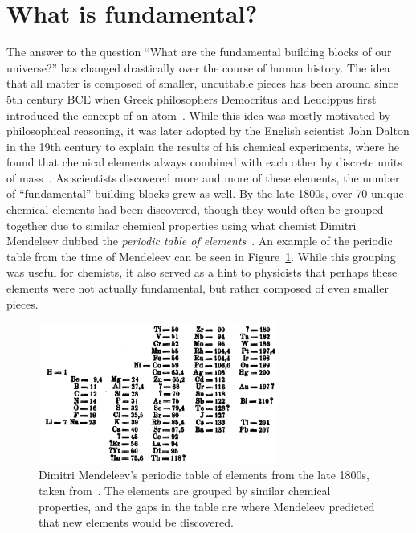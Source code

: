 \section{What is fundamental?}
The answer to the question ``What are the fundamental building blocks of our universe?'' has changed drastically over the course of human history. The idea that all matter is composed of smaller, uncuttable pieces has been around since 5th century BCE when Greek philosophers Democritus and Leucippus first introduced the concept of an atom~\cite{GreekAtom}. While this idea was mostly motivated by philosophical reasoning, it was later adopted by the English scientist John Dalton in the 19th century to explain the results of his chemical experiments, where he found that chemical elements always combined with each other by discrete units of mass~\cite{Dalton}. As scientists discovered more and more of these elements, the number of ``fundamental'' building blocks grew as well. By the late 1800s, over 70 unique chemical elements had been discovered, though they would often be grouped together due to similar chemical properties using what chemist Dimitri Mendeleev dubbed the \textit{periodic table of elements}~\cite{PeriodicTable}. An example of the periodic table from the time of Mendeleev can be seen in Figure~\ref{fig:periodic_table}. While this grouping was useful for chemists, it also served as a hint to physicists that perhaps these elements were not actually fundamental, but rather composed of even smaller pieces.

\begin{figure}[ht]
    \centering
    \includegraphics[width=0.7\textwidth]{figures/introduction/PeriodicTable.png}
    \caption{Dimitri Mendeleev's periodic table of elements from the late 1800s, taken from~\cite{MendeleevPaper}. The elements are grouped by similar chemical properties, and the gaps in the table are where Mendeleev predicted that new elements would be discovered.}
    \label{fig:periodic_table}
\end{figure}



